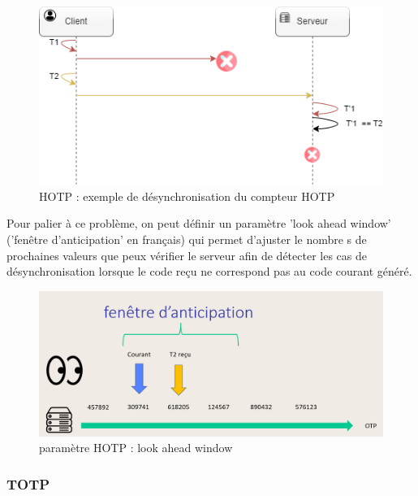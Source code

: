 \documentclass[a4paper, 10pt]{article}
\newcommand{\totp}{\textsc{TOTP} }
\newcommand{\hotp}{\textsc{HOTP} }
\begin{document}
\begin{figure}[H]
        \centering
        \includegraphics[scale=0.80]{img/1/2/hotp-desync.drawio.png}
        \caption{\hotp : exemple de désynchronisation du compteur \hotp\\}
        \label{fig:hotp-desync}
\end{figure}

    Pour palier à ce problème, on peut définir un \textcolor{mygreen}{paramètre 'look ahead window'} ('fenêtre d'anticipation' en français) qui permet d'ajuster \textcolor{myblue}{le nombre s de prochaines valeurs} que peux vérifier le serveur afin de \textcolor{mygreen}{détecter les cas de désynchronisation} lorsque le code reçu ne correspond pas au code courant généré. 

\begin{figure}[H]
        \centering
        \includegraphics[scale=0.40]{img/1/2/hotp-param-look_ahead_window.png}
        \caption{paramètre \hotp :  look ahead window\\}
        \label{fig:hotp-param-look_ahead_window}
\end{figure}





            \subsubsection{\totp}
\end{document}

